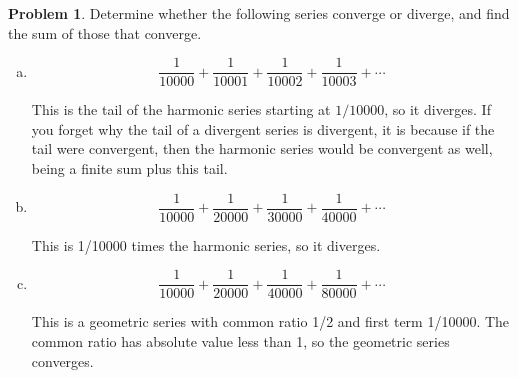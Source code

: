 \documentclass[11pt,oneside]{amsart}
\theoremstyle{definition}
\newtheorem{problem}{Problem}
\theoremstyle{plain}
\begin{document}
    \begin{problem}
        Determine whether the following series converge or diverge, and find the sum of those that converge.
        \begin{enumerate}[(a)]
            \item \[\frac 1{10000}+\frac 1{10001}+\frac 1{10002}+\frac 1{10003}+\cdots\]
            \begin{solution}
                This is the tail of the harmonic series starting at $1/10000$, so it diverges. If you forget why the tail of a divergent series is divergent, it is because if the tail were convergent, then the harmonic series would be convergent as well, being a finite sum plus this tail.
            \end{solution}
            \item \[\frac 1{10000}+\frac 1{20000}+\frac 1{30000}+\frac 1{40000}+\cdots\]
            \begin{solution}
                This is 1/10000 times the harmonic series, so it diverges.
            \end{solution}
            \item \[\frac 1{10000}+\frac 1{20000}+\frac 1{40000}+\frac 1{80000}+\cdots\]
            \begin{solution}
                This is a geometric series with common ratio 1/2 and first term 1/10000. The common ratio has absolute value less than 1, so the geometric series converges.
            \end{solution}
        \end{enumerate}
    \end{problem}
\end{document}
